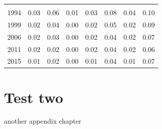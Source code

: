 \documentclass[
  11pt,
a4paper
]{article}
\begin{document}
\begin{longtable}[t]{rrrrrrrr}
\addlinespace[0.3em]
\multicolumn{8}{l}{\textbf{Zimbabwe}}\\
\hspace{1em}1994 & 0.03 & 0.06 & 0.01 & 0.03 & 0.08 & 0.04 & 0.10\\
\hspace{1em}1999 & 0.02 & 0.04 & 0.00 & 0.02 & 0.05 & 0.02 & 0.09\\
\hspace{1em}2006 & 0.02 & 0.03 & 0.00 & 0.02 & 0.04 & 0.02 & 0.07\\
\hspace{1em}2011 & 0.02 & 0.02 & 0.00 & 0.02 & 0.04 & 0.02 & 0.06\\
\hspace{1em}2015 & 0.01 & 0.02 & 0.00 & 0.01 & 0.04 & 0.01 & 0.07\\*
\end{longtable}

\hypertarget{test-two}{%
\section{Test two}\label{test-two}}

another appendix chapter
\end{document}
